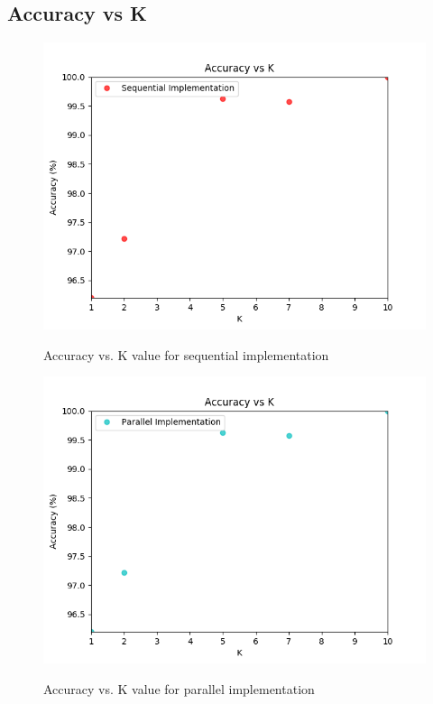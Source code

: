 \documentclass{article}
\begin{document}
\subsection{Accuracy vs K}
\begin{figure}[H]
\centering
\includegraphics[width=\linewidth]{assets/acc_vs_K_sequential.png}
\label{fig:test1}
\vspace{-2pt}
\caption{Accuracy vs. K value for sequential implementation}
\end{figure}
\begin{figure}[H]
\centering
\includegraphics[width=\linewidth]{assets/acc_vs_K_parallel.png}
\label{fig:test1}
\vspace{-2pt}
\caption{Accuracy vs. K value for parallel implementation}
\end{figure}
\end{document}

